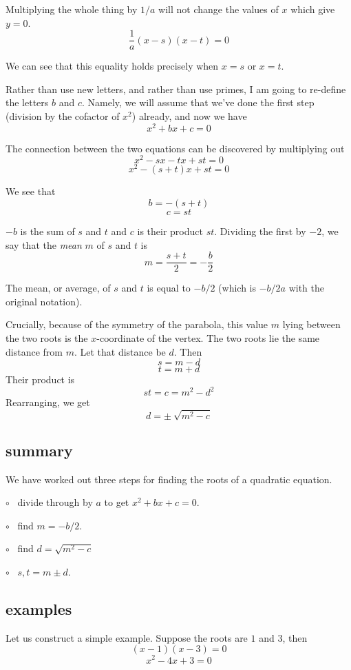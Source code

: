 \documentclass[11pt, oneside]{article}
\begin{document}
Multiplying the whole thing by $1/a$ will not change the values of $x$ which give $y = 0$.
\[ \frac{1}{a} (x - s)(x - t) = 0 \]

We can see that this equality holds precisely when $x = s$ or $x = t$.  

Rather than use new letters, and rather than use primes, I am going to re-define the letters $b$ and $c$.  Namely, we will assume that we've done the first step (division by the cofactor of $x^2$) already, and now we have
\[ x^2 + bx + c = 0 \]

The connection between the two equations can be discovered by multiplying out
\[ x^2 - sx -tx + st = 0 \]
\[ x^2 - (s + t)x + st = 0 \]

We see that
\[ b = - (s + t) \]
\[ c = st \]

$-b$ is the sum of $s$ and $t$ and $c$ is their product $st$.  Dividing the first by $-2$, we say that the \emph{mean} $m$ of $s$ and $t$ is
\[ m = \frac{s + t}{2} = - \frac{b}{2} \]

The mean, or average, of $s$ and $t$ is equal to $-b/2$ (which is $-b/2a$ with the original notation).  

Crucially, because of the symmetry of the parabola, this value $m$ lying between the two roots is the $x$-coordinate of the vertex.  The two roots lie the same distance from $m$.  Let that distance be $d$.  Then
\[ s = m - d \]
\[ t = m + d \]
Their product is
\[ st = c = m^2 - d^2 \]
Rearranging, we get
\[ d = \pm \ \sqrt{m^2 - c} \]

\subsection*{summary}

We have worked out three steps for finding the roots of a quadratic equation.

$\circ$ \ divide through by $a$ to get $x^2 + bx + c = 0$.

$\circ$ \ find $m = -b/2$.

$\circ$ \ find $d = \sqrt{m^2 - c}$

$\circ$ \ $s, t = m \pm d$.

\subsection*{examples}

Let us construct a simple example.  Suppose the roots are $1$ and $3$, then
\[ (x - 1)(x - 3) = 0 \]
\[ x^2 - 4x + 3 = 0 \]
\end{document}
